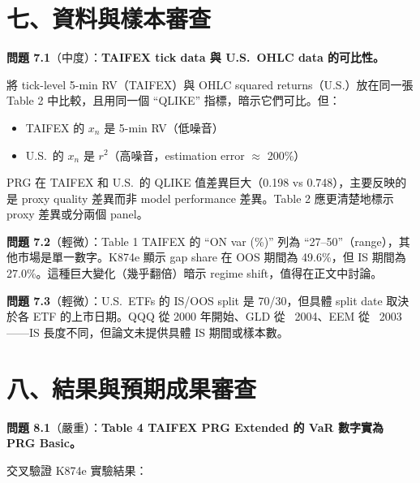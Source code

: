\documentclass[12pt,a4paper]{article}
\begin{document}
\section{七、資料與樣本審查}

\textbf{問題 7.1}（\textcolor{warncolor}{中度}）：\textbf{TAIFEX tick data 與 U.S.\ OHLC data 的可比性。}

將 tick-level 5-min RV（TAIFEX）與 OHLC squared returns（U.S.）放在同一張 Table 2 中比較，且用同一個 ``QLIKE'' 指標，暗示它們可比。但：
\begin{itemize}
    \item TAIFEX 的 $x_n$ 是 5-min RV（低噪音）
    \item U.S.\ 的 $x_n$ 是 $r^2$（高噪音，estimation error $\approx$ 200\%）
\end{itemize}

PRG 在 TAIFEX 和 U.S.\ 的 QLIKE 值差異巨大（0.198 vs 0.748），主要反映的是 proxy quality 差異而非 model performance 差異。Table 2 應更清楚地標示 proxy 差異或分兩個 panel。

\textbf{問題 7.2}（輕微）：Table 1 TAIFEX 的 ``ON var (\%)'' 列為 ``27--50''（range），其他市場是單一數字。K874e 顯示 gap share 在 OOS 期間為 49.6\%，但 IS 期間為 27.0\%。這種巨大變化（幾乎翻倍）暗示 regime shift，值得在正文中討論。

\textbf{問題 7.3}（輕微）：U.S.\ ETFs 的 IS/OOS split 是 70/30，但具體 split date 取決於各 ETF 的上市日期。QQQ 從 2000 年開始、GLD 從 ~2004、EEM 從 ~2003——IS 長度不同，但論文未提供具體 IS 期間或樣本數。


\section{八、結果與預期成果審查}

\textbf{問題 8.1}（\textcolor{errorred}{嚴重}）：\textbf{Table 4 TAIFEX PRG Extended 的 VaR 數字實為 PRG Basic。}

交叉驗證 K874e 實驗結果：
\end{document}
